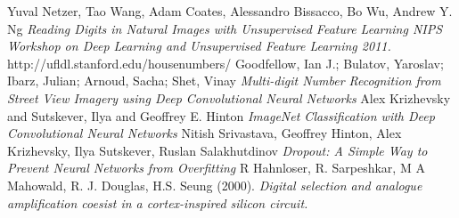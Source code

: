 \documentclass[12pt]{article}
\begin{document}
\begin{thebibliography}{9}
Yuval Netzer, Tao Wang, Adam Coates, Alessandro Bissacco, Bo Wu, Andrew Y. Ng 
\textit{Reading Digits in Natural Images with Unsupervised Feature Learning NIPS Workshop on Deep Learning and Unsupervised Feature Learning 2011.}
http://ufldl.stanford.edu/housenumbers/
Goodfellow, Ian J.; Bulatov, Yaroslav; Ibarz, Julian; Arnoud, Sacha; Shet, Vinay
\textit{Multi-digit Number Recognition from Street View Imagery using Deep Convolutional Neural Networks}
Alex Krizhevsky and Sutskever, Ilya and Geoffrey E. Hinton
\textit{ImageNet Classification with Deep Convolutional Neural Networks}
Nitish Srivastava, Geoffrey Hinton, Alex Krizhevsky, Ilya Sutskever, Ruslan Salakhutdinov
\textit{Dropout: A Simple Way to Prevent Neural Networks from Overfitting}
R Hahnloser, R. Sarpeshkar, M A Mahowald, R. J. Douglas, H.S. Seung (2000). 
\textit{Digital selection and analogue amplification coesist in a cortex-inspired silicon circuit.}

\end{thebibliography}
	
\end{document}
